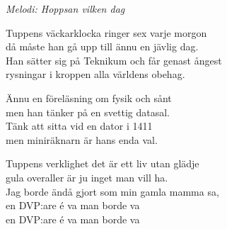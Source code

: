 {\footnotesize\textit{Melodi: Hoppsan vilken dag}}\par
\vspace{10pt}
Tuppens väckarklocka ringer sex varje morgon\\
då måste han gå upp till ännu en jävlig dag.\\
Han sätter sig på Teknikum och får genast ångest\\
rysningar i kroppen alla världens obehag.\par
\vspace{10pt}
Ännu en föreläsning om fysik och sånt\\
men han tänker på en svettig datasal.\\
Tänk att sitta vid en dator i 1411\\
men miniräknarn är hans enda val.\par
\vspace{10pt}
Tuppens verklighet det är ett liv utan glädje\\
gula overaller är ju inget man vill ha.\\
Jag borde ändå gjort som min gamla mamma sa,\\
en DVP:are é va man borde va\\
\revrpt en DVP:are é va man borde va\rpt
